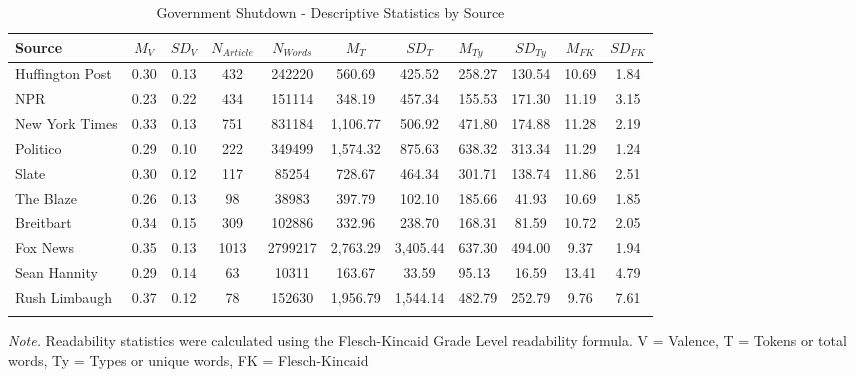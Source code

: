 \documentclass[english,,man]{apa6}
\begin{document}
\begin{table}[tbp]

\begin{center}
\begin{threeparttable}

\caption{\label{tab:exp2-source-descriptives-gs}Government Shutdown - Descriptive Statistics by Source}

\small{

\begin{tabular}{lcccccclccc}
\toprule
Source & $M_V$ & $SD_V$ & $N_{Article}$ & $N_{Words}$ & $M_T$ & $SD_T$ & $M_{Ty}$ & $SD_{Ty}$ & $M_{FK}$ & $SD_{FK}$\\
\midrule
Huffington Post & 0.30 & 0.13 & 432 & 242220 & 560.69 & 425.52 & 258.27 & 130.54 & 10.69 & 1.84\\
NPR & 0.23 & 0.22 & 434 & 151114 & 348.19 & 457.34 & 155.53 & 171.30 & 11.19 & 3.15\\
New York Times & 0.33 & 0.13 & 751 & 831184 & 1,106.77 & 506.92 & 471.80 & 174.88 & 11.28 & 2.19\\
Politico & 0.29 & 0.10 & 222 & 349499 & 1,574.32 & 875.63 & 638.32 & 313.34 & 11.29 & 1.24\\
Slate & 0.30 & 0.12 & 117 & 85254 & 728.67 & 464.34 & 301.71 & 138.74 & 11.86 & 2.51\\
The Blaze & 0.26 & 0.13 & 98 & 38983 & 397.79 & 102.10 & 185.66 & 41.93 & 10.69 & 1.85\\
Breitbart & 0.34 & 0.15 & 309 & 102886 & 332.96 & 238.70 & 168.31 & 81.59 & 10.72 & 2.05\\
Fox News & 0.35 & 0.13 & 1013 & 2799217 & 2,763.29 & 3,405.44 & 637.30 & 494.00 & 9.37 & 1.94\\
Sean Hannity & 0.29 & 0.14 & 63 & 10311 & 163.67 & 33.59 & 95.13 & 16.59 & 13.41 & 4.79\\
Rush Limbaugh & 0.37 & 0.12 & 78 & 152630 & 1,956.79 & 1,544.14 & 482.79 & 252.79 & 9.76 & 7.61\\
\bottomrule
\addlinespace
\end{tabular}

}

\begin{tablenotes}[para]
\normalsize{\textit{Note.} Readability statistics were calculated using the Flesch-Kincaid Grade Level readability formula. V = Valence, T = Tokens or total words, Ty = Types or unique words, FK = Flesch-Kincaid}
\end{tablenotes}

\end{threeparttable}
\end{center}

\end{table}
\end{document}
